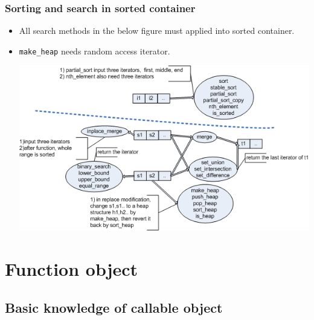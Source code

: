 \documentclass[a4paper,11pt,twoside]{book}
\begin{document}
\subsubsection{Sorting and search in sorted container}
\begin{itemize}
	\item All search methods in the below figure must applied into sorted container.
	\item \texttt{make\_heap} needs random access iterator.
	\begin{center}
	\includegraphics[width=0.85\linewidth]{pics/std4.png}
	\end{center}

\end{itemize}



\section{Function object}
\subsection{Basic knowledge of callable object}
\end{document}
